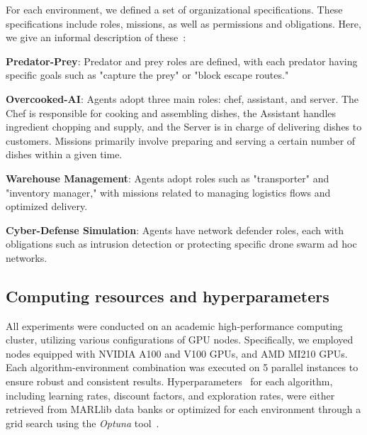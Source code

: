 \documentclass[sigconf]{aamas}
\begin{document}
For each environment, we defined a set of organizational specifications. These specifications include roles, missions, as well as permissions and obligations. Here, we give an informal description of these~\hyperref[fn:github]{\footnotemark[1]}:
%
\begin{enumerate*}[label={\roman*) },itemjoin={; \quad}]

    \item \textbf{Predator-Prey}: Predator and prey roles are defined, with each predator having specific goals such as "capture the prey" or "block escape routes."

    \item \textbf{Overcooked-AI}: Agents adopt three main roles: chef, assistant, and server. The Chef is responsible for cooking and assembling dishes, the Assistant handles ingredient chopping and supply, and the Server is in charge of delivering dishes to customers. Missions primarily involve preparing and serving a certain number of dishes within a given time.
    
    \item \textbf{Warehouse Management}: Agents adopt roles such as "transporter" and "inventory manager," with missions related to managing logistics flows and optimized delivery.
    
    \item \textbf{Cyber-Defense Simulation}: Agents have network defender roles, each with obligations such as intrusion detection or protecting specific drone swarm ad hoc networks.
\end{enumerate*}

\subsection{Computing resources and hyperparameters}

All experiments were conducted on an academic high-performance computing cluster, utilizing various configurations of GPU nodes. Specifically, we employed nodes equipped with NVIDIA A100 and V100 GPUs, and AMD MI210 GPUs. Each algorithm-environment combination was executed on 5 parallel instances to ensure robust and consistent results.
%
Hyperparameters~\hyperref[fn:github]{\footnotemark[1]} for each algorithm, including learning rates, discount factors, and exploration rates, were either retrieved from MARLlib data banks or optimized for each environment through a grid search using the \textit{Optuna} tool~\cite{akiba2019optuna}.
\end{document}
